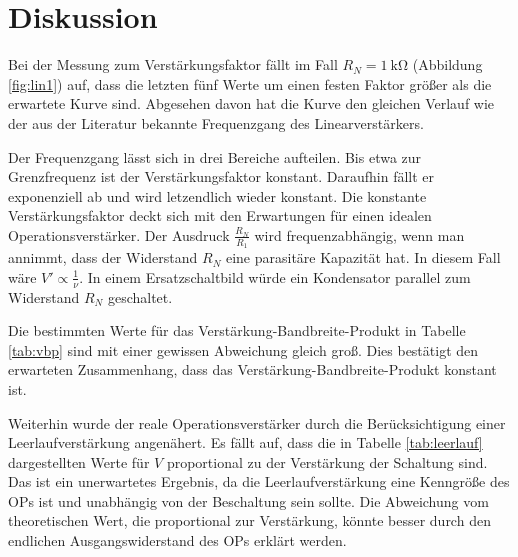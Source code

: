 \section{Diskussion}
Bei der Messung zum Verstärkungsfaktor fällt im Fall $R_N = \SI{1}{\kilo \ohm}$ (Abbildung \ref{fig:lin1}) auf, dass die letzten fünf Werte um einen festen Faktor größer als die erwartete Kurve sind.
Abgesehen davon hat die Kurve den gleichen Verlauf wie der aus der  Literatur bekannte Frequenzgang des Linearverstärkers.

Der Frequenzgang lässt sich in drei Bereiche aufteilen.
Bis etwa zur Grenzfrequenz ist der Verstärkungsfaktor konstant.
Daraufhin fällt er exponenziell ab und wird letzendlich wieder konstant.
Die konstante Verstärkungsfaktor deckt sich mit den Erwartungen für einen idealen Operationsverstärker.
Der Ausdruck $\frac{R_N}{R_1}$ wird frequenzabhängig, wenn man annimmt, dass der Widerstand $R_N$ eine parasitäre Kapazität hat.
In diesem Fall wäre $V' \propto \frac{1}{\nu}$.
In einem Ersatzschaltbild würde ein Kondensator parallel zum Widerstand $R_N$ geschaltet.

Die bestimmten Werte für das Verstärkung-Bandbreite-Produkt in Tabelle \ref{tab:vbp} sind mit einer gewissen Abweichung gleich groß.
Dies bestätigt den erwarteten Zusammenhang, dass das Verstärkung-Bandbreite-Produkt konstant ist.

Weiterhin wurde der reale Operationsverstärker durch die Berücksichtigung einer Leerlaufverstärkung angenähert.
Es fällt auf, dass die in Tabelle \ref{tab:leerlauf} dargestellten Werte für $V$ proportional zu der Verstärkung der Schaltung sind.
Das ist ein unerwartetes Ergebnis, da die Leerlaufverstärkung eine Kenngröße des OPs ist und unabhängig von der Beschaltung sein sollte.
Die Abweichung vom theoretischen Wert, die proportional zur Verstärkung, könnte besser durch den endlichen Ausgangswiderstand des OPs erklärt werden.